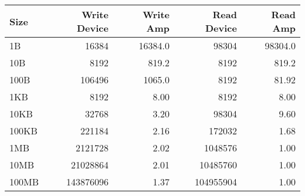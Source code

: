 \begin{tabular}{lrrrr}
\toprule
Size & Write Device & Write Amp & Read Device & Read Amp \\
\midrule
1B & 16384 & 16384.0 & 98304 & 98304.0 \\
10B & 8192 & 819.2 & 8192 & 819.2 \\
100B & 106496 & 1065.0 & 8192 & 81.92 \\
1KB & 8192 & 8.00 & 8192 & 8.00 \\
10KB & 32768 & 3.20 & 98304 & 9.60 \\
100KB & 221184 & 2.16 & 172032 & 1.68 \\
1MB & 2121728 & 2.02 & 1048576 & 1.00 \\
10MB & 21028864 & 2.01 & 10485760 & 1.00 \\
100MB & 143876096 & 1.37 & 104955904 & 1.00 \\
\bottomrule
\end{tabular}
